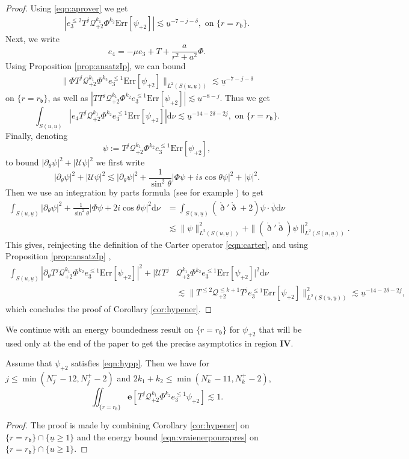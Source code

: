 \documentclass[reqno]{amsart}
\numberwithin{equation}{section}
\newcommand{\intS}{\int_{S(u,\ubar)}}
\newcommand{\quatre}{\mathbf{IV}}
\newcommand{\mcq}{\mathcal{Q}}
\newcommand{\ubar}{{\underline{u}}}
\newcommand{\errp}{\mathrm{Err}[\Psip]}
\newcommand{\carterp}{\mcq_{+2}}
\newcommand{\dee}{\mathrm{d}}
\newcommand{\ener}{\mathbf{e}}
\newcommand{\drond}{\mathring{\eth}}
\newcommand{\rb}{r_\mathfrak{b}}
\newcommand{\Psip}{\psi_{+2}}
\newcommand{\psip}{\psi_{+2}}
\theoremstyle{plain}
\theoremstyle{definition}
\theoremstyle{remark}
\numberwithin{equation}{section}
\begin{document}
 \begin{proof}
Using \eqref{eqn:aprover} we get 
\begin{align}\label{eqn:bienbienbien}
    |e_3^{\leq 2}T^j \mcq_{+2}^{k_1}\Phi^{k_2}\errp|\lesssim\ubar^{-7-j-\delta}, \text{   on   }\{r=\rb\}.
\end{align}
Next, we write 
$$e_4=-\mu e_3+T+\frac{a}{r^2+a^2}\Phi.$$ 
Using Proposition \ref{prop:ansatzIp}, we can bound
\begin{align*}
    \|\Phi T^j \mcq_{+2}^{k_1}\Phi^{k_2}e_3^{\leq 1}\errp\|_{L^2(S(u,\ubar))}\lesssim\ubar^{-7-j-\delta}
\end{align*}
on $\{r=\rb\}$, as well as $|TT^j \mcq_{+2}^{k_1}\Phi^{k_2}e_3^{\leq 1}\errp|\lesssim\ubar^{-8-j}$. Thus we get 
$$\intS|e_4T^j \mcq_{+2}^{k_1}\Phi^{k_2}e_3^{\leq 1}\errp|\dee\nu\lesssim\ubar^{-14-2\delta-2j}, \text{   on   }\{r=\rb\}.$$
Finally, denoting 
$$\psi:=T^j \mcq_{+2}^{k_1}\Phi^{k_2}e_3^{\leq 1}\errp,$$
to bound $|\partial_\theta\psi|^2+|\mathcal{U}\psi|^2$ we first write
$$|\partial_\theta\psi|^2+|\mathcal{U}\psi|^2\lesssim |\partial_\theta\psi|^2+\frac{1}{\sin^2\theta}|\Phi\psi+is\cos\theta\psi|^2+|\psi|^2.$$
Then we use an integration by parts formula (see for example \cite[Eq. (32)]{dhrteuk}) to get
\begin{align}
    \int_{{S(u,\ubar)}}|\partial_\theta\psi|^2+\frac{1}{\sin^2\theta}|\Phi\psi+2i\cos\theta\psi|^2\dee\nu&=\int_{S(u,\ubar)}(\drond'\drond+2)\psi\cdot\overline{\psi}\dee\nu\nonumber\\
    &\lesssim \|\psi\|^2_{L^2({S(u,\ubar)})}+\|(\drond'\drond)\psi\|^2_{L^2({S(u,\ubar)})}.\label{eqn:ipppppp}
\end{align}
This gives, reinjecting the definition of the Carter operator \eqref{eqn:carter}, and using Proposition \ref{prop:ansatzIp} ,
\begin{align*}
    \int_{{S(u,\ubar)}}|\partial_\theta T^j \mcq_{+2}^{k_1}\Phi^{k_2}e_3^{\leq 1}\errp|^2+|\mathcal{U}T^j &\mcq_{+2}^{k_1}\Phi^{k_2}e_3^{\leq 1}\errp|^2\dee\nu\\
    &\lesssim \|T^{\leq 2}\mcq_{+2}^{\leq k+1}T^je_3^{\leq 1}\errp\|^2_{L^2({S(u,\ubar)})}\lesssim\ubar^{-14-2\delta-2j},
\end{align*}
which concludes the proof of Corollary \ref{cor:hypener}.
 \end{proof}
 We continue with an energy boundedness result on $\{r=\rb\}$ for $\Psip$ that will be used only at the end of the paper to get the precise asymptotics in region $\quatre$.
\begin{cor}\label{cor:symmetric}
    Assume that $\Psip$ satisfies \eqref{eqn:hypp}. Then we have for $j\leq \min(N_j^--12,N_j^+-2)$ and $2k_1+k_2\leq \min(N_k^--11,N_k^+-2)$,
    $$\iint_{\{r=\rb\}}\ener[T^j\carterp^{k_1}\Phi^{k_2}e_3^{\leq 1}\psip]\lesssim 1.$$
\end{cor}
\begin{proof}
    The proof is made by combining Corollary \ref{cor:hypener} on $\{r=\rb\}\cap\{\ubar\geq 1\}$ and the energy bound \eqref{eqn:vraienerpourapres} on $\{r=\rb\}\cap\{u\geq 1\}$.
\end{proof}
\end{document}
